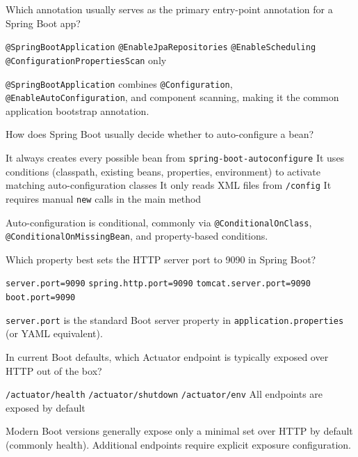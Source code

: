 
\question[4]
Which annotation usually serves as the primary entry-point annotation for a Spring Boot app?
\begin{choices}
  \CorrectChoice \texttt{@SpringBootApplication}
  \choice \texttt{@EnableJpaRepositories}
  \choice \texttt{@EnableScheduling}
  \choice \texttt{@ConfigurationPropertiesScan} only
\end{choices}
\begin{solution}
  \texttt{@SpringBootApplication} combines \texttt{@Configuration}, \texttt{@EnableAutoConfiguration}, and component scanning, making it the common application bootstrap annotation.
\end{solution}

\question[4]
How does Spring Boot usually decide whether to auto-configure a bean?
\begin{choices}
  \choice It always creates every possible bean from \texttt{spring-boot-autoconfigure}
  \CorrectChoice It uses conditions (classpath, existing beans, properties, environment) to activate matching auto-configuration classes
  \choice It only reads XML files from \texttt{/config}
  \choice It requires manual \texttt{new} calls in the main method
\end{choices}
\begin{solution}
  Auto-configuration is conditional, commonly via \texttt{@ConditionalOnClass}, \texttt{@ConditionalOnMissingBean}, and property-based conditions.
\end{solution}

\question[4]
Which property best sets the HTTP server port to 9090 in Spring Boot?
\begin{choices}
  \CorrectChoice \texttt{server.port=9090}
  \choice \texttt{spring.http.port=9090}
  \choice \texttt{tomcat.server.port=9090}
  \choice \texttt{boot.port=9090}
\end{choices}
\begin{solution}
  \texttt{server.port} is the standard Boot server property in \texttt{application.properties} (or YAML equivalent).
\end{solution}

\question[4]
In current Boot defaults, which Actuator endpoint is typically exposed over HTTP out of the box?
\begin{choices}
  \CorrectChoice \texttt{/actuator/health}
  \choice \texttt{/actuator/shutdown}
  \choice \texttt{/actuator/env}
  \choice All endpoints are exposed by default
\end{choices}
\begin{solution}
  Modern Boot versions generally expose only a minimal set over HTTP by default (commonly health). Additional endpoints require explicit exposure configuration.
\end{solution}

